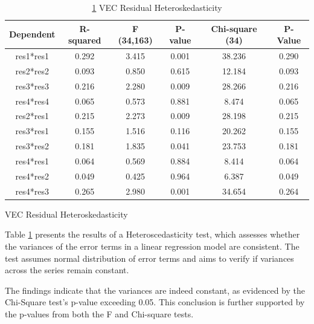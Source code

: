 \documentclass{beamer}
\newcommand{\vspaceFive}{\vspace{5pt}}
\begin{document}
	\begin{frame}
		\begin{table}
			\caption{ \ref{table:residual_hetro} VEC Residual Heteroskedasticity}
			\label{table:residual_hetro}
			
			\begin{tabular}{cccccc}
				\toprule
			 	Dependent & R-squared & F (34,163) & P-value & Chi-square (34) & P-Value \\
			 	\midrule
			 	res1*res1 & 0.292 & 3.415 & 0.001 & 38.236 & 0.290 \\
			 	res2*res2 & 0.093 & 0.850 & 0.615 & 12.184 & 0.093 \\
			 	res3*res3 & 0.216 & 2.280 & 0.009 & 28.266 & 0.216 \\
			 	res4*res4 & 0.065 & 0.573 & 0.881 & 8.474 & 0.065 \\
			 	res2*res1 & 0.215 & 2.273 & 0.009 & 28.198 & 0.215 \\
			 	res3*res1 & 0.155 & 1.516 & 0.116 & 20.262 & 0.155 \\
			 	res3*res2 & 0.181 & 1.835 & 0.041 & 23.753 & 0.181 \\
			 	res4*res1 & 0.064 & 0.569 & 0.884 & 8.414 & 0.064 \\
			 	res4*res2 & 0.049 & 0.425 & 0.964 & 6.387 & 0.049 \\
			 	res4*res3 & 0.265 & 2.980 & 0.001 & 34.654 & 0.264 \\
				
				\bottomrule
			\end{tabular}
		\end{table}
		
	\end{frame}
	\begin{frame}{ VEC Residual Heteroskedasticity}
		\begin{block}{}
			\vspaceFive
			Table \ref{table:residual_hetro} presents the results of a Heteroscedasticity test, which assesses whether the variances of the error terms in a linear regression model are consistent. The test assumes normal distribution of error terms and aims to verify if variances across the series remain constant.
			\vspaceFive
		\end{block}
		
		\begin{block}{}
			\vspaceFive
			The findings indicate that the variances are indeed constant, as evidenced by the Chi-Square test's p-value exceeding 0.05. This conclusion is further supported by the p-values from both the F and Chi-square tests.
			\vspaceFive
		\end{block}
	\end{frame}
\end{document}

